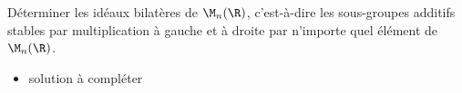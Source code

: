 \begin{enonce}
\begin{exercise}[ID={RMS134 E573},subtitle={Oral
    Mines-Ponts},theme={algebre},annee={2023},concours={mines-ponts},filiere={MP}]
Déterminer les idéaux bilatères de $\M_n(\R)$, c'est-à-dire les
sous-groupes additifs stables par multiplication à gauche et à droite
par n'importe quel élément de $\M_n(\R)$.
\end{exercise}
\begin{solution}
  \begin{itemize}
  \item solution à compléter
  \end{itemize}
\end{solution}
\end{enonce}